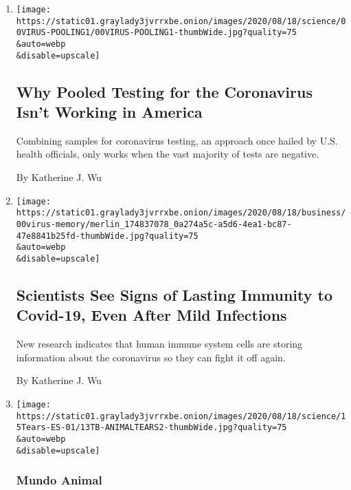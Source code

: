 \begin{enumerate}
\def\labelenumi{\arabic{enumi}.}
\item
  \href{/2020/08/18/health/coronavirus-pool-testing.html}{}

  \texttt{[image: https://static01.graylady3jvrrxbe.onion/images/2020/08/18/science/00VIRUS-POOLING1/00VIRUS-POOLING1-thumbWide.jpg?quality=75\\\&auto=webp\\\&disable=upscale]}

  \hypertarget{why-pooled-testing-for-the-coronavirus-isnt-working-in-america}{%
  \subsection{Why Pooled Testing for the Coronavirus Isn't Working in
  America}\label{why-pooled-testing-for-the-coronavirus-isnt-working-in-america}}

  Combining samples for coronavirus testing, an approach once hailed by
  U.S. health officials, only works when the vast majority of tests are
  negative.

  By Katherine J. Wu
\item
  \href{/2020/08/16/health/coronavirus-immunity-antibodies.html}{}

  \texttt{[image: https://static01.graylady3jvrrxbe.onion/images/2020/08/18/business/00virus-memory/merlin\_174837078\_0a274a5c-a5d6-4ea1-bc87-47e8841b25fd-thumbWide.jpg?quality=75\\\&auto=webp\\\&disable=upscale]}

  \hypertarget{scientists-see-signs-of-lasting-immunity-to-covid-19-even-after-mild-infections}{%
  \subsection{Scientists See Signs of Lasting Immunity to Covid-19, Even
  After Mild
  Infections}\label{scientists-see-signs-of-lasting-immunity-to-covid-19-even-after-mild-infections}}

  New research indicates that human immune system cells are storing
  information about the coronavirus so they can fight it off again.

  By Katherine J. Wu
\item
  \href{/es/2020/08/15/espanol/ciencia-y-tecnologia/ojo-seco.html}{}

  \texttt{[image: https://static01.graylady3jvrrxbe.onion/images/2020/08/18/science/15Tears-ES-01/13TB-ANIMALTEARS2-thumbWide.jpg?quality=75\\\&auto=webp\\\&disable=upscale]}

  \hypertarget{mundo-animal}{%
  \subsubsection{Mundo Animal}\label{mundo-animal}}


\end{enumerate}
